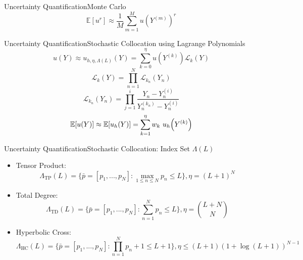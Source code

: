 \documentclass{beamer}
\newcommand{\expv}[1]{\ensuremath{\mathbb{E}[ #1]}}
\begin{document}
\begin{frame}{Uncertainty Quantification}{Monte Carlo}
\[\expv{u^r}\approx\frac{1}{M}\sum_{m=1}^M u\left(Y^{(m)}\right)^r\]
\end{frame}

\begin{frame}{Uncertainty Quantification}{Stochastic Collocation using Lagrange Polynomials}\vspace{-20pt}
\small
\begin{equation*}\label{approx}
u(Y)\approx u_{h,\eta,\Lambda(L)}(Y)=\sum_{k=0}^\eta u(Y^{(k)})\mathcal{L}_k(Y)
\end{equation*}
\begin{equation*}
\mathcal{L}_k(Y)=\prod_{n=1}^N \mathcal{L}_{k_n}(Y_n)
\end{equation*}
\begin{equation*}
\mathcal{L}_{k_n}(Y_n)=\prod_{j=1}^i \frac{Y_n-Y_n^{(i)}}{Y_n^{(k_n)}-Y_n^{(i)}}
\end{equation*}
\begin{equation*}
\expv{u(Y)}\approx\expv{u_h(Y)}=\sum_{k=1}^\eta w_k ~u_h\qty(Y^{(k)})
\end{equation*}
\end{frame}

\begin{frame}{Uncertainty Quantification}{Stochastic Collocation: Index Set $\Lambda(L)$}\vspace{-20pt}
\begin{itemize}
\item Tensor Product:\scriptsize\[\Lambda_\text{TP}(L)=\Big\{\bar p=[p_1,...,p_N]: \max_{1\leq n\leq N}p_n\leq L \Big\},\eta=(L+1)^N\]\normalsize
\item Total Degree: \scriptsize\[\Lambda_\text{TD}(L)=\Big\{\bar p=[p_1,...,p_N]:\sum_{n=1}^N p_n \leq L \Big\},\eta={L+N\choose N}\]\normalsize
\item Hyperbolic Cross: \scriptsize\[\Lambda_\text{HC}(L)=\Big\{\bar p=[p_1,...,p_N]:\prod_{n=1}^N p_n+1 \leq L+1 \Big\},\eta\leq (L+1)(1+\log(L+1))^{N-1}\]
\end{itemize}
\end{frame}
\end{document}
